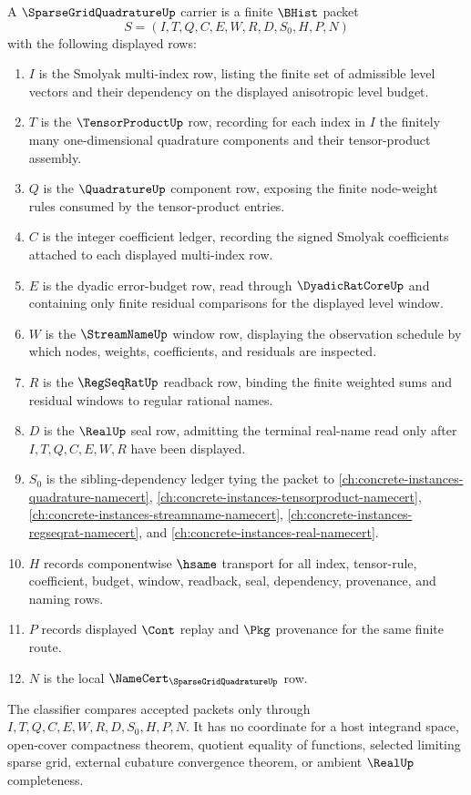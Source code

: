\begin{definition}
\label{def:sparse-grid-quadrature-carrier}
A $\SparseGridQuadratureUp$ carrier is a finite $\BHist$ packet
$$
S=(I,T,Q,C,E,W,R,D,S_0,H,P,N)
$$
with the following displayed rows:
\begin{enumerate}
\item $I$ is the Smolyak multi-index row, listing the finite set of admissible level vectors and their dependency on the displayed anisotropic level budget.
\item $T$ is the $\TensorProductUp$ row, recording for each index in $I$ the finitely many one-dimensional quadrature components and their tensor-product assembly.
\item $Q$ is the $\QuadratureUp$ component row, exposing the finite node-weight rules consumed by the tensor-product entries.
\item $C$ is the integer coefficient ledger, recording the signed Smolyak coefficients attached to each displayed multi-index row.
\item $E$ is the dyadic error-budget row, read through $\DyadicRatCoreUp$ and containing only finite residual comparisons for the displayed level window.
\item $W$ is the $\StreamNameUp$ window row, displaying the observation schedule by which nodes, weights, coefficients, and residuals are inspected.
\item $R$ is the $\RegSeqRatUp$ readback row, binding the finite weighted sums and residual windows to regular rational names.
\item $D$ is the $\RealUp$ seal row, admitting the terminal real-name read only after $I,T,Q,C,E,W,R$ have been displayed.
\item $S_0$ is the sibling-dependency ledger tying the packet to \autoref{ch:concrete-instances-quadrature-namecert}, \autoref{ch:concrete-instances-tensorproduct-namecert}, \autoref{ch:concrete-instances-streamname-namecert}, \autoref{ch:concrete-instances-regseqrat-namecert}, and \autoref{ch:concrete-instances-real-namecert}.
\item $H$ records componentwise $\hsame$ transport for all index, tensor-rule, coefficient, budget, window, readback, seal, dependency, provenance, and naming rows.
\item $P$ records displayed $\Cont$ replay and $\Pkg$ provenance for the same finite route.
\item $N$ is the local $\NameCert_{\SparseGridQuadratureUp}$ row.
\end{enumerate}
The classifier compares accepted packets only through $I,T,Q,C,E,W,R,D,S_0,H,P,N$. It has no coordinate for a host integrand space, open-cover compactness theorem, quotient equality of functions, selected limiting sparse grid, external cubature convergence theorem, or ambient $\RealUp$ completeness.
\end{definition}

